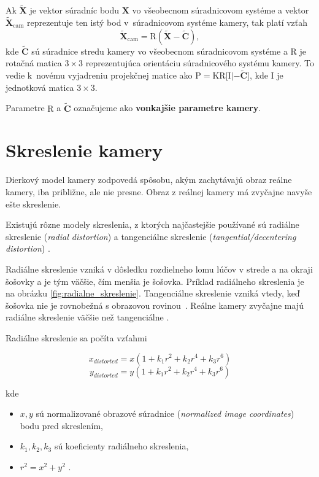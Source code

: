 Ak $\widetilde{\mathbf{X}}$ je vektor súradníc bodu $\mathbf{X}$ vo všeobecnom súradnicovom systéme a vektor $\widetilde{\mathbf{X}}_{\mathrm{cam}}$ reprezentuje ten istý bod v~súradnicovom systéme kamery, tak platí vzťah 
$$\widetilde{\mathbf{X}}_{\mathrm{cam}} = \mathrm{R} (\widetilde{\mathbf{X}} - \widetilde{\mathbf{C}}),$$ 
kde $\widetilde{\mathbf{C}}$ sú súradnice stredu kamery vo všeobecnom súradnicovom systéme a $\mathrm{R}$ je rotačná matica $3 \times 3$ reprezentujúca orientáciu súradnicového systému kamery. To vedie k~novému vyjadreniu projekčnej matice ako $\mathrm{P} = \mathrm{K} \mathrm{R} \bigl[ \mathrm{I} | - \widetilde{\mathbf{C}} \bigr]$, kde $\mathrm{I}$ je jednotková matica $3 \times 3$.

Parametre $\mathrm{R}$ a $\widetilde{\mathbf{C}}$ označujeme ako \textbf{vonkajšie parametre kamery}.

\section{Skreslenie kamery}

Dierkový model kamery zodpovedá spôsobu, akým zachytávajú obraz reálne kamery, iba približne, ale nie presne. Obraz z reálnej kamery má zvyčajne navyše ešte skreslenie.

Existujú rôzne modely skreslenia, z ktorých najčastejšie používané sú radiálne skreslenie (\emph{radial distortion}) a tangenciálne skreslenie (\emph{tangential/decentering distortion}) \cite{sun_cooperstock_camera_calibration}.

Radiálne skreslenie vzniká v dôsledku rozdielneho lomu lúčov v strede a na okraji šošovky a je tým väčšie, čím menšia je šošovka. Príklad radiálneho skreslenia je na obrázku \ref{fig:radialne_skreslenie}. Tangenciálne skreslenie vzniká vtedy, keď šošovka nie je rovnobežná s obrazovou rovinou~\cite{matlab_camera_calibration}. Reálne kamery zvyčajne majú radiálne skreslenie väčšie než tangenciálne \cite{opencv_camera_calibration_older}.

Radiálne skreslenie sa počíta vzťahmi

$$x_{distorted} = x(1 + k_1 r^2 + k_2 r^4 + k_3 r^6)$$
$$y_{distorted} = y(1 + k_1 r^2 + k_2 r^4 + k_3 r^6)$$

kde

\begin{itemize}
    \item $x, y$ sú normalizované obrazové súradnice (\emph{normalized image coordinates}) bodu pred skreslením,
    \item $k_1, k_2, k_3$ sú koeficienty radiálneho skreslenia,
    \item $r^2 = x^2 + y^2$ \cite{opencv_camera_calibration}.
\end{itemize}

